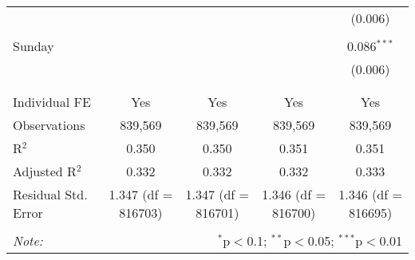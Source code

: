 \documentclass[
]{article}
\begin{document}
\begin{table}[!htbp]
{\begin{tabular}{@{\extracolsep{5pt}}lcccc}
  &  &  &  & (0.006) \\ 
  & & & & \\ 
 Sunday &  &  &  & 0.086$^{***}$ \\ 
  &  &  &  & (0.006) \\ 
  & & & & \\ 
\hline \\[-1.8ex] 
Individual FE & Yes & Yes & Yes & Yes \\ 
Observations & 839,569 & 839,569 & 839,569 & 839,569 \\ 
R$^{2}$ & 0.350 & 0.350 & 0.351 & 0.351 \\ 
Adjusted R$^{2}$ & 0.332 & 0.332 & 0.332 & 0.333 \\ 
Residual Std. Error & 1.347 (df = 816703) & 1.347 (df = 816701) & 1.346 (df = 816700) & 1.346 (df = 816695) \\ 
\hline 
\hline \\[-1.8ex] 
\textit{Note:}  & \multicolumn{4}{r}{$^{*}$p$<$0.1; $^{**}$p$<$0.05; $^{***}$p$<$0.01} \\ 
\end{tabular}
} 
\end{table} 
\newpage
\end{document}
